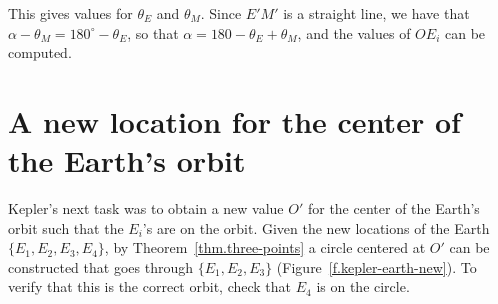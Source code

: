 This gives values for $\theta_E$ and $\theta_M$. Since $E'M'$ is a straight line, we have that $\alpha-\theta_M = 180^\circ -\theta_E$, so that $\alpha = 180 - \theta_E + \theta_M$, and the values of $OE_i$ can be computed.

\section{A new location for the center of the Earth's orbit}

Kepler's next task was to obtain a new value $O'$ for the center of the Earth's orbit such that the $E_i$'s are on the orbit. Given the new locations of the Earth $\{E_1,E_2,E_3,E_4\}$, by Theorem~\ref{thm.three-points} a circle centered at $O'$ can be constructed that goes through $\{E_1,E_2,E_3\}$ (Figure~\ref{f.kepler-earth-new}). To verify that this is the correct orbit, check that $E_4$ is on the circle.


%
%
%
%
%
%
%
%
%
%
%
%

